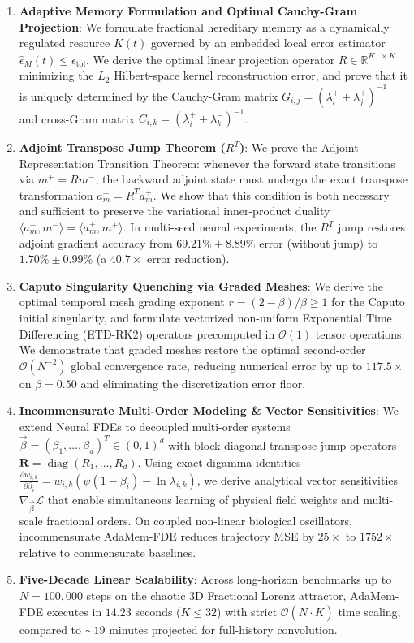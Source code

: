 \documentclass[11pt,a4paper]{article}
\theoremstyle{plain}
\theoremstyle{definition}
\newcommand{\R}{\mathbb{R}}
\newcommand{\etol}{\epsilon_{\mathrm{tol}}}
\newcommand{\diag}{\operatorname{diag}}
\begin{document}
\begin{enumerate}
    \item \textbf{Adaptive Memory Formulation and Optimal Cauchy-Gram Projection}: We formulate fractional hereditary memory as a dynamically regulated resource $K(t)$ governed by an embedded local error estimator $\widehat{\epsilon}_M(t) \le \etol$. We derive the optimal linear projection operator $R \in \R^{K^+ \times K^-}$ minimizing the $L_2$ Hilbert-space kernel reconstruction error, and prove that it is uniquely determined by the Cauchy-Gram matrix $G_{i,j} = (\lambda_i^+ + \lambda_j^+)^{-1}$ and cross-Gram matrix $C_{i,k} = (\lambda_i^+ + \lambda_k^-)^{-1}$.
    
    \item \textbf{Adjoint Transpose Jump Theorem ($R^T$)}: We prove the Adjoint Representation Transition Theorem: whenever the forward state transitions via $m^+ = R m^-$, the backward adjoint state must undergo the exact transpose transformation $a_m^- = R^T a_m^+$. We show that this condition is both necessary and sufficient to preserve the variational inner-product duality $\langle a_m^-, m^- \rangle = \langle a_m^+, m^+ \rangle$. In multi-seed neural experiments, the $R^T$ jump restores adjoint gradient accuracy from $69.21\% \pm 8.89\%$ error (without jump) to $1.70\% \pm 0.99\%$ (a $40.7\times$ error reduction).
    
    \item \textbf{Caputo Singularity Quenching via Graded Meshes}: We derive the optimal temporal mesh grading exponent $r = (2-\beta)/\beta \ge 1$ for the Caputo initial singularity, and formulate vectorized non-uniform Exponential Time Differencing (ETD-RK2) operators precomputed in $\mathcal{O}(1)$ tensor operations. We demonstrate that graded meshes restore the optimal second-order $\mathcal{O}(N^{-2})$ global convergence rate, reducing numerical error by up to $117.5\times$ on $\beta = 0.50$ and eliminating the discretization error floor.
    
    \item \textbf{Incommensurate Multi-Order Modeling \& Vector Sensitivities}: We extend Neural FDEs to decoupled multi-order systems $\vec{\beta} = (\beta_1, \dots, \beta_d)^T \in (0, 1)^d$ with block-diagonal transpose jump operators $\mathbf{R} = \diag(R_1, \dots, R_d)$. Using exact digamma identities $\frac{\partial w_{i,k}}{\partial \beta_i} = w_{i,k}(\psi(1-\beta_i) - \ln \lambda_{i,k})$, we derive analytical vector sensitivities $\nabla_{\vec{\beta}} \mathcal{L}$ that enable simultaneous learning of physical field weights and multi-scale fractional orders. On coupled non-linear biological oscillators, incommensurate AdaMem-FDE reduces trajectory MSE by $25\times$ to $1752\times$ relative to commensurate baselines.
    
    \item \textbf{Five-Decade Linear Scalability}: Across long-horizon benchmarks up to $N = 100,000$ steps on the chaotic 3D Fractional Lorenz attractor, AdaMem-FDE executes in $14.23$ seconds ($\bar{K} \le 32$) with strict $\mathcal{O}(N \cdot \bar{K})$ time scaling, compared to $\sim 19$ minutes projected for full-history convolution.
\end{enumerate}
\end{document}
